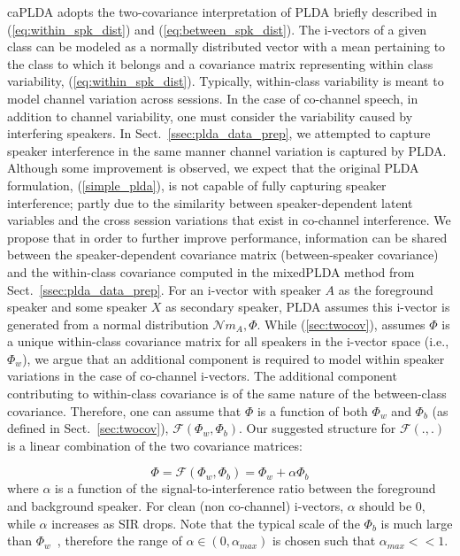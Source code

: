 caPLDA adopts the two-covariance interpretation of PLDA briefly described in (\ref{eq:within_spk_dist}) and (\ref{eq:between_spk_dist}). 
The i-vectors of a given class can be modeled as a normally distributed vector with a mean pertaining to the class to which it belongs and a covariance matrix representing within class variability, (\ref{eq:within_spk_dist}). 
Typically, within-class variability is meant to model channel variation across sessions. 
In the case of co-channel speech, in addition to channel variability, one must consider the variability caused by interfering speakers. 
In Sect.~\ref{ssec:plda_data_prep}, we attempted to capture speaker interference in the same manner channel variation is captured by PLDA. 
Although some improvement is observed, we expect that the original PLDA formulation, (\ref{simple_plda}), is not capable of fully capturing speaker interference; partly due to the similarity between speaker-dependent latent variables and the cross session variations that exist in co-channel interference. 
We propose that in order to further improve performance, information can be shared between the speaker-dependent covariance matrix (between-speaker covariance) and the within-class covariance computed in the mixedPLDA method from Sect.~\ref{ssec:plda_data_prep}. 
For an i-vector with speaker $A$ as the foreground speaker and some speaker $X$ as secondary speaker, PLDA assumes this i-vector is generated from a normal distribution $\mathcal{N} {m_A,\Phi}$. 
While (\ref{sec:twocov}), assumes $\Phi$ is a unique within-class covariance matrix for all speakers in the i-vector space (i.e., $\Phi_w$), we argue that an additional component is required to model within speaker variations in the case of co-channel i-vectors. 
The additional component contributing to within-class covariance is of the same nature of the between-class covariance. 
Therefore, one can assume that $\Phi$ is a function of both $\Phi_w$ and $\Phi_b$ (as defined in Sect.~\ref{sec:twocov}), $ \mathcal{F} (\Phi_w,\Phi_b)$. 
Our suggested structure for $ \mathcal{F} (.,.)$ is a linear combination of the two covariance matrices: 

\begin{equation}
\Phi = \mathcal{F} (\Phi_w,\Phi_b) = 
\Phi_w + \alpha\Phi_b
\end{equation}
where $\alpha$ is a function of the signal-to-interference ratio between the foreground and background speaker. 
For clean (non co-channel) i-vectors, $\alpha$ should be $0$, while $\alpha$ increases as SIR drops. 
Note that the typical scale of the $\Phi_b$ is much large than $\Phi_w$~\cite{glembek2014wccLDA}, therefore the range of $\alpha \in (0,\alpha_{max})$ is chosen such that $\alpha_{max} << 1$.

